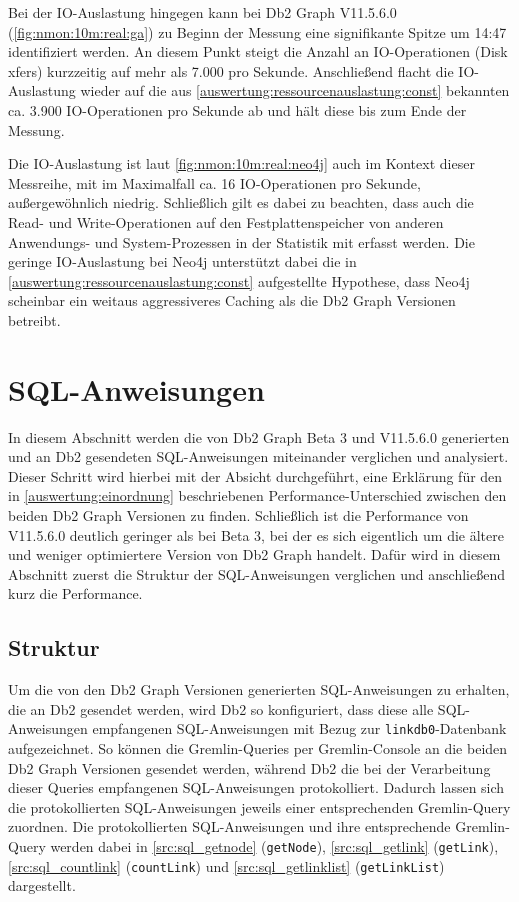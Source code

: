 Bei der IO-Auslastung hingegen kann bei Db2 Graph V11.5.6.0 (\autoref{fig:nmon:10m:real:ga}) zu Beginn der Messung eine signifikante Spitze um 14:47 identifiziert werden. An diesem Punkt steigt die Anzahl an IO-Operationen (Disk xfers) kurzzeitig auf mehr als 7.000 pro Sekunde. Anschließend flacht die IO-Auslastung wieder auf die aus \autoref{auswertung:ressourcenauslastung:const} bekannten ca. 3.900 IO-Operationen pro Sekunde ab und hält diese bis zum Ende der Messung.

Die IO-Auslastung ist laut \autoref{fig:nmon:10m:real:neo4j} auch im Kontext dieser Messreihe, mit im Maximalfall ca. 16 IO-Operationen pro Sekunde, außergewöhnlich niedrig. Schließlich gilt es dabei zu beachten, dass auch die Read- und Write-Operationen auf den Festplattenspeicher von anderen Anwendungs- und System-Prozessen in der Statistik mit erfasst werden. Die geringe IO-Auslastung bei Neo4j unterstützt dabei die in \autoref{auswertung:ressourcenauslastung:const} aufgestellte Hypothese, dass Neo4j scheinbar ein weitaus aggressiveres Caching als die Db2 Graph Versionen betreibt.

\section{SQL-Anweisungen}
\label{sql}
In diesem Abschnitt werden die von Db2 Graph Beta 3 und V11.5.6.0 generierten und an Db2 gesendeten SQL-Anweisungen miteinander verglichen und analysiert. Dieser Schritt wird hierbei mit der Absicht durchgeführt, eine Erklärung für den in \autoref{auswertung:einordnung} beschriebenen Performance-Unterschied zwischen den beiden Db2 Graph Versionen zu finden. Schließlich ist die Performance von V11.5.6.0  deutlich geringer als bei Beta 3, bei der es sich eigentlich um die ältere und weniger optimiertere Version von Db2 Graph handelt. Dafür wird in diesem Abschnitt zuerst die Struktur der SQL-Anweisungen verglichen und anschließend kurz die Performance. 

\subsection{Struktur}
\label{sql:struktur}
Um die von den Db2 Graph Versionen generierten SQL-Anweisungen zu erhalten, die an Db2 gesendet werden, wird Db2 so konfiguriert, dass diese alle SQL-Anweisungen empfangenen SQL-Anweisungen mit Bezug zur \texttt{linkdb0}-Datenbank aufgezeichnet. So können die Gremlin-Queries per Gremlin-Console an die beiden Db2 Graph Versionen gesendet werden, während Db2 die bei der Verarbeitung dieser Queries empfangenen SQL-Anweisungen protokolliert. Dadurch lassen sich die protokollierten SQL-Anweisungen jeweils einer entsprechenden Gremlin-Query zuordnen. Die protokollierten SQL-Anweisungen und ihre entsprechende Gremlin-Query werden dabei in \autoref{src:sql_getnode} (\texttt{getNode}), \autoref{src:sql_getlink} (\texttt{getLink}), \autoref{src:sql_countlink} (\texttt{countLink}) und \autoref{src:sql_getlinklist} (\texttt{getLinkList}) dargestellt.


